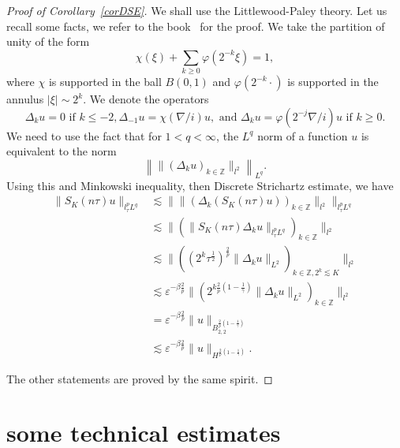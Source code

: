 \documentclass[10pt,a4paper]{article}
\begin{document}
  \begin{proof}[Proof of Corollary~\ref{corDSE}]
    We shall use the Littlewood-Paley theory. Let us recall some facts, we refer
    to the book~\cite{BCD11} for the proof. We take the partition of unity of
    the form 
    \[  \chi(\xi) + \sum_{k\geq0}\varphi(2^{-k}\xi) = 1 ,\]
    where \(\chi\) is supported in the ball \(B(0,1)\) and \(\varphi(2^{-k}\cdot)\) is
    supported in the annulus \(|\xi| \sim 2^k\). We denote the operators 
    \[ \Delta_k u = 0 \text{ if } k \leq -2, \Delta_{-1} u = \chi(\nabla/i) u,
    \text{ and } \Delta_k u = \varphi(2^{-j}\nabla/i) u \text{ if } k \geq 0.\]
    We need to use the fact that for \(1<q<\infty\), the \(L^q\) norm of a function
    \(u\) is equivalent to the norm 
    \[ \left\| \|(\Delta_k u)_{k\in \mathbb Z}\|_{l^2} \right\|_{L^q}. \]
    Using this and Minkowski inequality, then Discrete
    Strichartz estimate, we have
    \begin{equation}
      \begin{aligned}
        \|S_K(n\tau)u\|_{l^p_\tau L^q} & \lesssim \|\|(\Delta_k (S_K(n\tau) u))_{k\in \mathbb Z}\|_{l^2}\|_{l^p_\tau L^q} \\
        &\lesssim \|(\|S_K(n\tau) \Delta_k u\|_{l^p_\tau L^q})_{k\in \mathbb Z}\|_{l^2} \\
        &\lesssim \|((2^k\tau^\frac12)^\frac2p \|\Delta_k u\|_{L^2})_{k\in \mathbb Z, 2^k \lesssim K}\|_{l^2} \\
        &\lesssim \varepsilon^{-\beta\frac2p}\|(2^{k\frac2p(1-\frac1\gamma)} \|\Delta_k u\|_{L^2})_{k\in \mathbb Z}\|_{l^2} \\
        &= \varepsilon^{-\beta\frac2p}\|u\|_{B^{\frac2p(1-\frac1\gamma)}_{2,2}} \\
        &\lesssim
        \varepsilon^{-\beta\frac2p}\|u\|_{H^{\frac2p(1-\frac1\gamma)}}.
      \end{aligned}
    \end{equation}

    The other statements are proved by the same spirit.
  \end{proof}


  \section{some technical estimates}
\end{document}
